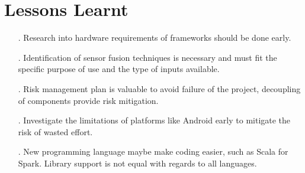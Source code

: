 \documentclass[prodmode,acmtosem]{acmsmall} %
\begin{document}
\section{Lessons Learnt}
\begin{itemize}
\item[.] Research into hardware requirements of frameworks should be done early.
\item[.] Identification of sensor fusion techniques is necessary and must fit the specific purpose of use and the type of inputs available.
\item[.] Risk management plan is valuable to avoid failure of the project, decoupling of components provide risk mitigation.
\item[.] Investigate the limitations of platforms like Android early to mitigate the risk of wasted effort.
\item[.] New programming language maybe make coding easier, such as Scala for Spark. Library support is not equal with regards to all languages.
\end{itemize}
\end{document}
